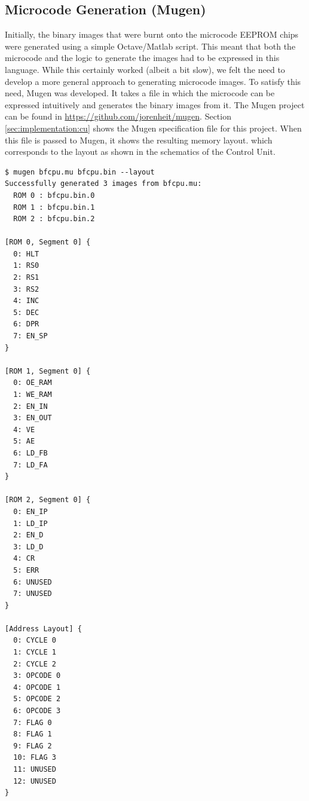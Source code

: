 \subsection{Microcode Generation (Mugen)}
Initially, the binary images that were burnt onto the microcode EEPROM chips were generated using a simple Octave/Matlab script. This meant that both the microcode and the logic to generate the images had to be expressed in this language. While this certainly worked (albeit a bit slow), we felt the need to develop a more general approach to generating microcode images. To satisfy this need, Mugen was developed. It takes a file in which the microcode can be expressed intuitively and generates the binary images from it. The Mugen project can be found in \url{https://github.com/jorenheit/mugen}. Section \ref{sec:implementation:cu} shows the Mugen specification file for this project. When this file is passed to Mugen, it shows the resulting memory layout. which corresponds to the layout as shown in the schematics of the Control Unit.

\begin{lstlisting}
$ mugen bfcpu.mu bfcpu.bin --layout
Successfully generated 3 images from bfcpu.mu: 
  ROM 0 : bfcpu.bin.0
  ROM 1 : bfcpu.bin.1
  ROM 2 : bfcpu.bin.2

[ROM 0, Segment 0] {
  0: HLT
  1: RS0
  2: RS1
  3: RS2
  4: INC
  5: DEC
  6: DPR
  7: EN_SP
}

[ROM 1, Segment 0] {
  0: OE_RAM
  1: WE_RAM
  2: EN_IN
  3: EN_OUT
  4: VE
  5: AE
  6: LD_FB
  7: LD_FA
}

[ROM 2, Segment 0] {
  0: EN_IP
  1: LD_IP
  2: EN_D
  3: LD_D
  4: CR
  5: ERR
  6: UNUSED
  7: UNUSED
}

[Address Layout] {
  0: CYCLE 0
  1: CYCLE 1
  2: CYCLE 2
  3: OPCODE 0
  4: OPCODE 1
  5: OPCODE 2
  6: OPCODE 3
  7: FLAG 0
  8: FLAG 1
  9: FLAG 2
  10: FLAG 3
  11: UNUSED
  12: UNUSED
}
\end{lstlisting}
